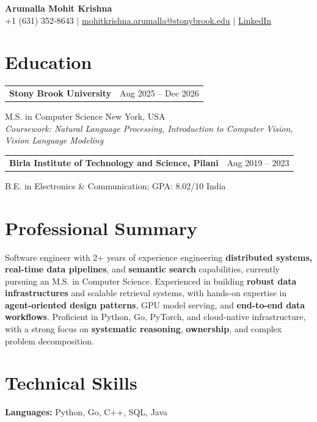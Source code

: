 \documentclass[letterpaper,10pt]{article}
\makeatletter
\newcommand{\entry}[2]{%
  \noindent
  \begin{tabularx}{\linewidth}
    {@{}>{\raggedright\arraybackslash}X@{\hspace{6pt}}r@{}}
    \textbf{#1} & #2
  \end{tabularx}\par
}
\makeatother
\begin{document}
\begin{center}
    {\LARGE\bfseries Arumalla Mohit Krishna}\\[3pt]
    +1 (631) 352-8643 $|$
    \href{mailto:mohitkrishna.arumalla@stonybrook.edu}
    {mohitkrishna.arumalla@stonybrook.edu} $|$
    \href{https://linkedin.com/in/mohit-krishna-arumalla}
    {LinkedIn}
\end{center}
\vspace{-8pt}

\section{Education}

\entry
  {\textbf{Stony Brook University}}
  {Aug 2025 -- Dec 2026}

M.S. in Computer Science \hfill New York, USA\\
\textit{
Coursework: Natural Language Processing,
Introduction to Computer Vision, Vision Language Modeling
}
\vspace{3pt}

\entry
  {\textbf{Birla Institute of Technology and Science, Pilani}}
  {Aug 2019 -- 2023}

B.E. in Electronics \& Communication; GPA: 8.02/10 \hfill India
\section{Professional Summary}

Software engineer with 2+ years of experience engineering \textbf{distributed systems, real-time data pipelines}, and \textbf{semantic search} capabilities, currently pursuing an M.S. in Computer Science. Experienced in building \textbf{robust data infrastructures} and scalable retrieval systems, with hands-on expertise in \textbf{agent-oriented design patterns}, GPU model serving, and \textbf{end-to-end data workflows}. Proficient in Python, Go, PyTorch, and cloud-native infrastructure, with a strong focus on \textbf{systematic reasoning}, \textbf{ownership}, and complex problem decomposition.

\section{Technical Skills}

\textbf{Languages:}
Python, Go, C++, SQL, Java\\
\end{document}
